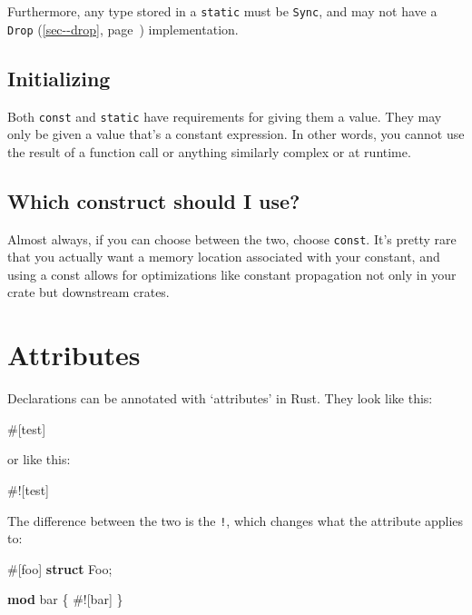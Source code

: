 \documentclass[a4paper,]{book}
\renewcommand*{\hyperref}[2][\ar]{%
  \def\ar{#2}%
  #2 (\autoref{#1}, page~\pageref{#1})}
\newenvironment{Shaded}{\begin{snugshade}}{\end{snugshade}}
\newcommand{\KeywordTok}[1]{\textcolor[rgb]{0.13,0.29,0.53}{\textbf{{#1}}}}
\newcommand{\AttributeTok}[1]{\textcolor[rgb]{0.77,0.63,0.00}{{#1}}}
\newcommand{\NormalTok}[1]{{#1}}
\begin{document}
Furthermore, any type stored in a \texttt{static} must be \texttt{Sync},
and may not have a \hyperref[sec--drop]{\texttt{Drop}} implementation.

\subsection{Initializing}\label{initializing}

Both \texttt{const} and \texttt{static} have requirements for giving
them a value. They may only be given a value that's a constant
expression. In other words, you cannot use the result of a function call
or anything similarly complex or at runtime.

\subsection{Which construct should I
use?}\label{which-construct-should-i-use}

Almost always, if you can choose between the two, choose \texttt{const}.
It's pretty rare that you actually want a memory location associated
with your constant, and using a const allows for optimizations like
constant propagation not only in your crate but downstream crates.

\section{Attributes}\label{sec--attributes}

Declarations can be annotated with `attributes' in Rust. They look like
this:

\begin{Shaded}
\begin{Highlighting}[]
\AttributeTok{#[}\NormalTok{test}\AttributeTok{]}
\end{Highlighting}
\end{Shaded}

or like this:

\begin{Shaded}
\begin{Highlighting}[]
\AttributeTok{#![}\NormalTok{test}\AttributeTok{]}
\end{Highlighting}
\end{Shaded}

The difference between the two is the \texttt{!}, which changes what the
attribute applies to:

\begin{Shaded}
\begin{Highlighting}[]
\AttributeTok{#[}\NormalTok{foo}\AttributeTok{]}
\KeywordTok{struct} \NormalTok{Foo;}

\KeywordTok{mod} \NormalTok{bar \{}
    \AttributeTok{#![}\NormalTok{bar}\AttributeTok{]}
\NormalTok{\}}
\end{Highlighting}
\end{Shaded}
\end{document}
